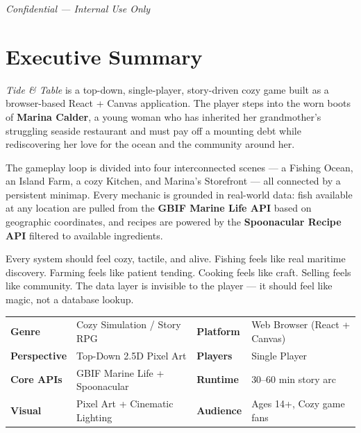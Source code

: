 \documentclass[11pt, letterpaper]{article}
\begin{document}
\vfill
\begin{center}
  \small\itshape\color{darkgray}Confidential --- Internal Use Only
\end{center}

\newpage

\tableofcontents
\newpage

\section{Executive Summary}

\textit{Tide \& Table} is a top-down, single-player, story-driven cozy game built as a browser-based React + Canvas application. The player steps into the worn boots of \textbf{Marina Calder}, a young woman who has inherited her grandmother's struggling seaside restaurant and must pay off a mounting debt while rediscovering her love for the ocean and the community around her.

The gameplay loop is divided into four interconnected scenes --- a Fishing Ocean, an Island Farm, a cozy Kitchen, and Marina's Storefront --- all connected by a persistent minimap. Every mechanic is grounded in real-world data: fish available at any location are pulled from the \textbf{GBIF Marine Life API} based on geographic coordinates, and recipes are powered by the \textbf{Spoonacular Recipe API} filtered to available ingredients.

\begin{tealbox}
Every system should feel cozy, tactile, and alive. Fishing feels like real maritime discovery. Farming feels like patient tending. Cooking feels like craft. Selling feels like community. The data layer is invisible to the player --- it should feel like magic, not a database lookup.
\end{tealbox}

\vspace{8pt}
\begin{tabular}{L{2.4cm} L{5.4cm} L{2.4cm} L{5.4cm}}
\textbf{\small\color{slate}Genre}     & \small Cozy Simulation / Story RPG     & \textbf{\small\color{slate}Platform}  & \small Web Browser (React + Canvas) \\
\textbf{\small\color{slate}Perspective} & \small Top-Down 2.5D Pixel Art       & \textbf{\small\color{slate}Players}   & \small Single Player \\
\textbf{\small\color{slate}Core APIs} & \small GBIF Marine Life + Spoonacular  & \textbf{\small\color{slate}Runtime}   & \small 30--60 min story arc \\
\textbf{\small\color{slate}Visual}    & \small Pixel Art + Cinematic Lighting  & \textbf{\small\color{slate}Audience}  & \small Ages 14+, Cozy game fans \\
\end{tabular}
\end{document}
